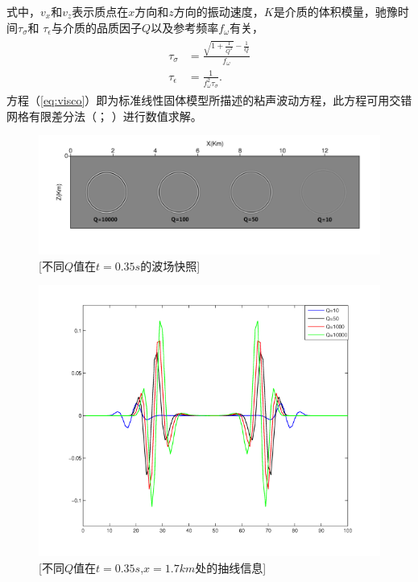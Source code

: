 式中，$v_x$和$v_z$表示质点在$x$方向和$z$方向的振动速度，$K$是介质的体积模量，驰豫时间$\tau_\sigma$和
$\tau_\epsilon$与介质的品质因子$Q$以及参考频率$f_\omega$有关，
\begin{eqnarray}
    \begin{aligned}
        \tau_\sigma &= \frac{\sqrt{1+\frac{1}{Q^2}}-\frac{1}{Q}}{f_\omega}\\
        \tau_\epsilon &= \frac{1}{f_\omega^2\tau_\sigma}.
    \end{aligned}
\end{eqnarray}
方程（\ref{eq:visco}）即为标准线性固体模型所描述的粘声波动方程，此方程可用交错网格有限差分法（；
）进行数值求解。

\begin{figure}[!htbp]
	    \centering
		\includegraphics[width=1.0\linewidth]{figure/wave_sls1}
		[不同$Q$值在$t=0.35s$的波场快照]
		\label{fig:wave_sls1}
\end{figure}
\begin{figure}[!htbp]
	    \centering
		\includegraphics[width=0.5\linewidth]{figure/wave_sls3}
		[不同$Q$值在$t=0.35s$,$x=1.7km$处的抽线信息]
		\label{fig:wave_sls3}
\end{figure}
